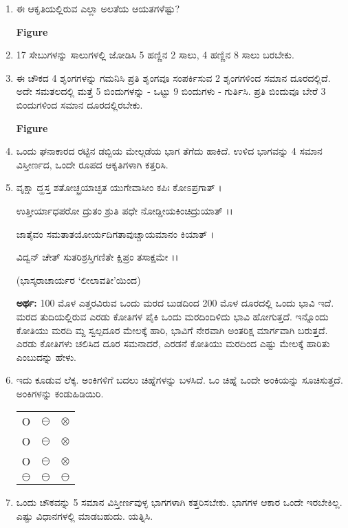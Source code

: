 \begin{enumerate}
\item ಈ ಆಕೃತಿಯಲ್ಲಿರುವ ಎಲ್ಲಾ ಅಲತೆಯ ಆಯತಗಳೆಷ್ಟು? 
\begin{center}
{\bf Figure}
\end{center}

\item 17 ಸೇಬುಗಳನ್ನು ಸಾಲುಗಳಲ್ಲಿ ಜೋಡಿಸಿ 5 ಹಣ್ಣಿನ 2 ಸಾಲು, 4 ಹಣ್ಣಿನ 8 ಸಾಲು ಬರಬೇಕು. 

\item ಈ ಚೌಕದ 4 ಶೃಂಗಗಳನ್ನು ಗಮನಿಸಿ ಪ್ರತಿ ಶೃಂಗವೂ ಸಂಪರ್ಕಿಸುವ 2 ಶೃಂಗಗಳಿಂದ ಸಮಾನ ದೂರದಲ್ಲಿದೆ. ಅದೇ ಸಮತಲದಲ್ಲಿ ಮತ್ತೆ 5 ಬಿಂದುಗಳನ್ನು - ಒಟ್ಟು 9 ಬಿಂದುಗಳು - ಗುರ್ತಿಸಿ. ಪ್ರತಿ ಬಿಂದುವೂ ಬೇರೆ 3 ಬಿಂದುಗಳಿಂದ ಸಮಾನ ದೂರದಲ್ಲಿರಬೇಕು. 
\begin{center}
{\bf Figure}
\end{center}

\item ಒಂದು ಘನಾಕಾರದ ರಟ್ಟಿನ ಡಬ್ಬಿಯ ಮೇಲ್ಗಡೆಯ ಭಾಗ ತೆಗೆದು ಹಾಕಿದೆ. ಉಳಿದ ಭಾಗವನ್ನು 4 ಸಮಾನ ವಿಸ್ತೀರ್ಣದ, ಒಂದೇ ರೂಪದ ಆಕೃತಿಗಳಾಗಿ ಕತ್ತರಿಸಿ. 

\item ವೃಕ್ಷಾ ದ್ಹಸ್ತ ಶತೋಚ್ಛ್ರಯಾಚ್ಛತ ಯುಗೇವಾಸೀಂ ಕಪಿಃ ಕೋಽಪ್ರಗಾತ್ ।

ಉತ್ತೀರ್ಯಾಧಪರೋ ದ್ರುತಂ ಶ್ರುತಿ ಪಧೇ ನೋಡ್ಡೀಯಕಿಂಚಿದ್ರುಯಾತ್ ।।

ಜಾತೈವಂ ಸಮತಾತಯೋರ್ಯದಿಗತಾವುಚ್ಚಾಯಮಾನಂ ಕಿಯಾತ್ ।

ವಿದ್ವನ್ ಚೇತ್ ಸುತರಿಶ್ರಸ್ತಿಗಣಿತೇ ಕ್ಷಿಪ್ರಂ ತಸಾಕ್ಷಮೇ ।।

\hfill (ಭಾಸ್ಕರಾಚಾರ್ಯರ `ಲೀಲಾವತೀ'ಯಿಂದ)

{\bf ಅರ್ಥ:}  100 ಮೊಳ ಎತ್ತರವಿರುವ ಒಂದು ಮರದ ಬುಡದಿಂದ 200  ಮೊಳ ದೂರದಲ್ಲಿ ಒಂದು ಭಾವಿ ಇದೆ. ಮರದ ತುದಿಯಲ್ಲಿರುವ ಎರಡು ಕೋತಿಗಳ ಪೈಕಿ ಒಂದು ಮರದಿಂದಿಳಿದು ಭಾವಿ ಹೋಗುತ್ತದೆ. ಇನ್ನೊಂದು ಕೋತಿಯು ಮರದಿ ಮ್ದ ಸ್ವಲ್ಪದೂರ ಮೇಲಕ್ಕೆ ಹಾರಿ, ಭಾವಿಗೆ ನೇರವಾಗಿ ಅಂತರಿಕ್ಷ ಮಾರ್ಗವಾಗಿ ಬರುತ್ತದೆ. ಎರಡು ಕೋತಿಗಳು ಚಲಿಸಿದ ದೂರ ಸಮನಾದರೆ, ಎರಡನೆ ಕೋತಿಯು ಮರದಿಂದ ಎಷ್ಟು ಮೇಲಕ್ಕೆ ಹಾರಿತು ಎಂಬುದನ್ನು ಹೇಳು. 

\item ಇದು ಕೂಡುವ ಲೆಕ್ಕ. ಅಂಕಿಗಳಿಗೆ ಬದಲು ಚಿಹ್ನೆಗಳನ್ನು ಬಳಸಿದೆ. ಒಂ ಚಿಹ್ನೆ ಒಂದೇ ಅಂಕಿಯನ್ನು ಸೂಚಿಸುತ್ತದೆ. ಅಂಕಿಗಳನ್ನು ಕಂಡುಹಿಡಿಯಿರಿ. 

\begin{tabular}[t]{ccc}
O & $\ominus$ & $\otimes$\\
O & $\ominus$ & $\otimes$\\
O & $\ominus$ & $\otimes$\\
\hline
$\ominus$ & $\ominus$ & $\ominus$
\end{tabular}

\item ಒಂದು ಚೌಕವನ್ನು 5 ಸಮಾನ ವಿಸ್ತೀರ್ಣವುಳ್ಳ ಭಾಗಗಳಾಗಿ ಕತ್ತರಿಸಬೇಕು. ಭಾಗಗಳ ಆಕಾರ ಒಂದೇ ಇರಬೇಕಿಲ್ಲ. ಎಷ್ಟು ವಿಧಾನಗಳಲ್ಲಿ ಮಾಡಬಹುದು. ಯತ್ನಿಸಿ.  


\end{enumerate}

